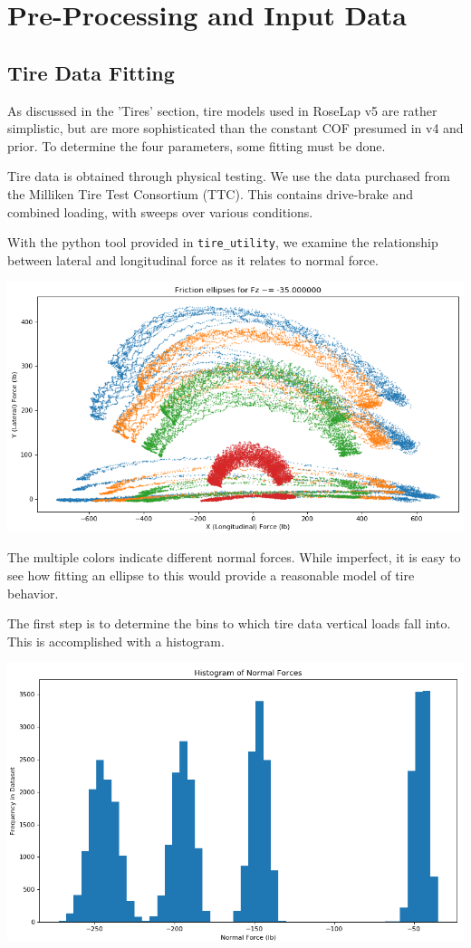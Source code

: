 \documentclass{article}
\begin{document}
\section{Pre-Processing and Input Data}

\subsection{Tire Data Fitting}
As discussed in the 'Tires' section, tire models used in RoseLap v5 are rather simplistic, but are more sophisticated than the constant COF presumed in v4 and prior. To determine the four parameters, some fitting must be done.

Tire data is obtained through physical testing. We use the data purchased from the Milliken Tire Test Consortium (TTC). This contains drive-brake and combined loading, with sweeps over various conditions.

With the python tool provided in \texttt{tire\_utility}, we examine the relationship between lateral and longitudinal force as it relates to normal force.

\includegraphics[width=\textwidth]{fric_ellipses.png}

The multiple colors indicate different normal forces. While imperfect, it is easy to see how fitting an ellipse to this would provide a reasonable model of tire behavior.

The first step is to determine the bins to which tire data vertical loads fall into. This is accomplished with a histogram.

\includegraphics[width=\textwidth]{fric_hist.png}
\end{document}
